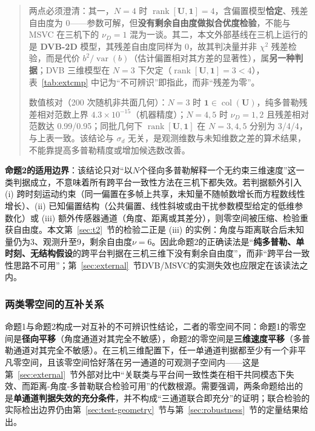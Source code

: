 \documentclass[UTF8,a4paper,zihao=-4]{ctexart}
\begin{document}
\begin{quote}
两点必须澄清：其一，\(N=4\) 时 \(\operatorname{rank}[\boldsymbol U,\mathbf 1]=4\)，含偏置模型\textbf{恰定}、残差自由度为 0——参数可解，但\textbf{没有剩余自由度做拟合优度检验}，不能与 MSVC 在三机下的 \(\nu_D=1\) 混为一谈。其二，本文外部基线在三机上运行的是 \textbf{DVB-2D} 模型，其残差自由度同样为 0，故其判决量并非 \(\chi^2\) 残差检验，而是代价 \(b^2/\operatorname{var}(b)\)（估计偏置相对其方差的显著性），属\textbf{另一种判据}；DVB 三维模型在 \(N=3\) 下欠定（\(\operatorname{rank}[\boldsymbol U,\mathbf 1]=3<4\)），表~\ref{tab:extcmp} 中记为“不可辨识”即指此，而非“残差为零”。

数值核对（200 次随机非共面几何）：\(N=3\) 时 \(\mathbf 1\in\operatorname{col}(\boldsymbol U)\)，纯多普勒残差相对范数上界 \(4.3\times10^{-15}\)（机器精度）；\(N=4,5\) 时 \(\nu_D=1,2\) 且残差相对范数达 0.99/0.95；同批几何下 \(\operatorname{rank}[\boldsymbol U,\mathbf 1]\) 在 \(N=3,4,5\) 分别为 3/4/4，与上表一致。该结论与 \(\sigma_d\) 无关，是观测维数与未知维数之差的算术结果，不能靠提高多普勒精度或增加候选数改善。
\end{quote}

\textbf{命题2的适用边界}：该结论只对“以\(N\)个径向多普勒解释一个无约束三维速度”这一类判据成立，不意味着所有跨平台一致性方法在三机下都失效。若判据额外引入 (i) 跨时刻运动约束（同一偏置在多帧上共享，未知量不随帧数增长而方程数线性增长）、(ii) 已知偏置结构（公共偏置、线性斜坡或由干扰参数模型给定的低维参数化）或 (iii) 额外传感器通道（角度、距离或其差分），则零空间被压缩、检验重获自由度。本文第~\ref{sec:t2}~节的检验二正是 (iii) 的实例：角度与距离联合后未知量仍为3、观测升至9，剩余自由度\(\nu=6\)。因此命题2的正确读法是“\textbf{纯多普勒、单时刻、无结构假设}的跨平台判据在三机三维下没有剩余自由度”，而非“跨平台一致性思路不可用”；第~\ref{sec:external}~节DVB/MSVC的实测失效也应限定在该读法之内。



\subsubsection{两类零空间的互补关系}\label{sec:complement}
命题1与命题2构成一对互补的不可辨识性结论，二者的零空间不同：命题1的零空间是\textbf{径向平移}（角度通道对其完全不敏感），命题2的零空间是\textbf{三维速度平移}（多普勒通道对其完全不敏感）。在三机三维配置下，任一单通道判据都至少有一个非平凡零空间，且该零空间恰好落在另一通道的可观测子空间内——这是第~\ref{sec:external}~节外部对比中“关联类与平台间一致性类在相干共同模态下失效、而距离-角度-多普勒联合检验可用”的代数根源。需要强调，两条命题给出的是\textbf{单通道判据失效的充分条件}，并不构成“三通道联合即充分”的证明；联合检验的实际检出边界仍由第~\ref{sec:test-geometry}~节与第~\ref{sec:robustness}~节的定量结果给出。
\end{document}
